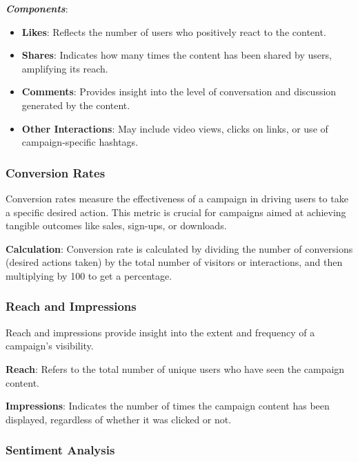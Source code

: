 \documentclass[
]{book}
\providecommand{\tightlist}{%
  \setlength{\itemsep}{0pt}\setlength{\parskip}{0pt}}
\begin{document}
\textbf{\emph{Components}}:

\begin{itemize}
\tightlist
\item
  \textbf{Likes}: Reflects the number of users who positively react to the content.
\item
  \textbf{Shares}: Indicates how many times the content has been shared by users, amplifying its reach.
\item
  \textbf{Comments}: Provides insight into the level of conversation and discussion generated by the content.
\item
  \textbf{Other Interactions}: May include video views, clicks on links, or use of campaign-specific hashtags.
\end{itemize}

\hypertarget{conversion-rates}{%
\subsubsection*{Conversion Rates}\label{conversion-rates}}

Conversion rates measure the effectiveness of a campaign in driving users to take a specific desired action. This metric is crucial for campaigns aimed at achieving tangible outcomes like sales, sign-ups, or downloads.

\textbf{Calculation}: Conversion rate is calculated by dividing the number of conversions (desired actions taken) by the total number of visitors or interactions, and then multiplying by 100 to get a percentage.

\hypertarget{reach-and-impressions}{%
\subsubsection*{Reach and Impressions}\label{reach-and-impressions}}

Reach and impressions provide insight into the extent and frequency of a campaign's visibility.

\textbf{Reach}: Refers to the total number of unique users who have seen the campaign content.

\textbf{Impressions}: Indicates the number of times the campaign content has been displayed, regardless of whether it was clicked or not.

\hypertarget{sentiment-analysis}{%
\subsubsection*{Sentiment Analysis}\label{sentiment-analysis}}
\end{document}
